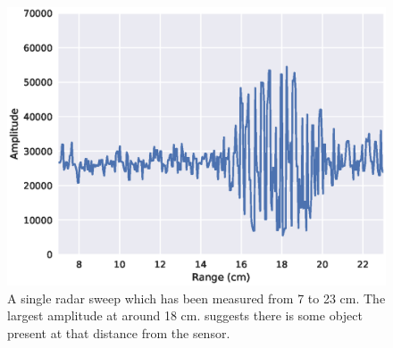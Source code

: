 


\begin{figure}[h]
	\centering
	\includegraphics[scale=0.7]{figs_temp/single_sweep_raw}
	\caption{A single radar sweep which has been measured from 7 to 23 cm. The largest amplitude at around 18 cm. suggests there is some object present at that distance from the sensor.}
	\label{fig:single_sweep_raw}
\end{figure}

